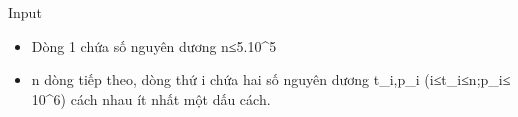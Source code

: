 Input
\begin{itemize}
	\item     Dòng 1 chứa số nguyên dương n≤5.10^5   
	\item     n dòng tiếp theo, dòng thứ i chứa hai số nguyên dương t\_i,p\_i (i≤t\_i≤n;p\_i≤ 10^6) cách nhau ít nhất một dấu cách.   
\end{itemize}